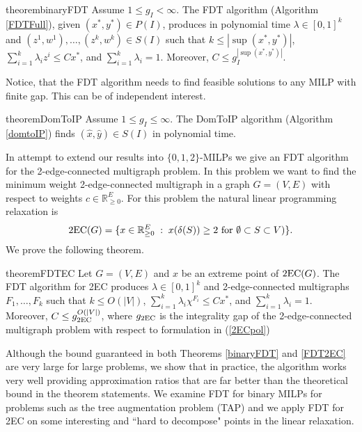 \begin{restatable}{theorem}{binaryFDT}
	\label{binaryFDT}
	Assume $1\leq g_I<\infty$. 	
The FDT algorithm (Algorithm \ref{FDTFull}), given $(x^*,y^*)\in P(I)$, produces in polynomial time $\lambda\in [0,1]^k$ and $(z^1,w^1),\ldots,(z^k,w^k) \in S(I)$ such that $k\leq |\sup(x^*,y^*)|$, $\sum_{i=1}^{k}\lambda_i z^i\leq Cx^*$, and $\sum_{i=1}^{k}\lambda_i = 1$. Moreover, $C\leq g_I^{|\sup(x^*,y^*)|}$.
\end{restatable}

Notice, that the FDT algorithm needs to find feasible solutions to any MILP with finite gap. This can be of independent interest.
\begin{restatable}{theorem}{DomToIP}
	\label{DomToIP}
		Assume $1\leq g_I \leq \infty$. The DomToIP algorithm (Algorithm \ref{domtoIP}) finds $(\hat{x},\hat{y})\in S(I)$ in polynomial time.
\end{restatable}

In attempt to extend our results into $\{0,1,2\}$-MILPs we give an FDT algorithm for the 2-edge-connected multigraph problem. In this problem we want to find the minimum weight 2-edge-connected multigraph in a graph $G=(V,E)$ with respect to weights $c\in \mathbb{R}^E_{\geq 0}$. For this problem the natural linear programming relaxation is
 \begin{equation}\label{2ECpol}
 \operatorname{2EC}(G)= \{x\in \mathbb{R}_{\geq 0}^{E}\;:\; x(\delta(S))\geq 2 \text{ for $\emptyset \subset S\subset V$})\}.\end{equation}
 We prove the following theorem.
 
 \begin{restatable}{theorem}{FDTEC}
 	\label{FDT2EC}
 	Let $G=(V,E)$ and $x$ be an extreme point of  $\operatorname{2EC}(G)$. The FDT algorithm for 2EC produces $\lambda\in [0,1]^k$ and 2-edge-connected multigraphs $F_1,\ldots,F_k$ such that $k\leq O(|V|)$, $\sum_{i=1}^{k}\lambda_i \chi^{F_i}\leq Cx^*$, and $\sum_{i=1}^{k}\lambda_i = 1$. Moreover, $C\leq g_{\operatorname{2EC}}^{O(|V|)}$, where $g_{\operatorname{2EC}}$ is the integrality gap of the 2-edge-connected multigraph problem with respect to formulation in (\ref{2ECpol}) 
 \end{restatable}
 
Although the bound guaranteed in both Theorems \ref{binaryFDT} and \ref{FDT2EC} are very large for large problems, we show that in practice, the algorithm works very well providing approximation ratios that are far better than the theoretical bound in the theorem statements. We examine FDT for binary MILPs for problems such as the tree augmentation problem (TAP) and we apply FDT for 2EC on some interesting and ``hard to decompose" points in the linear relaxation. 

